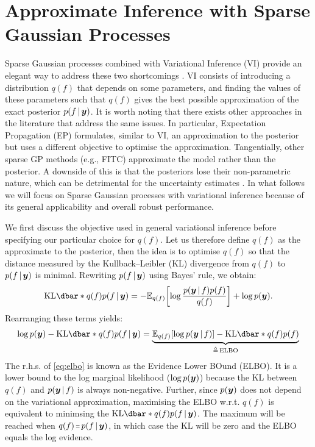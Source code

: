 \section{Approximate Inference with Sparse Gaussian Processes}

Sparse Gaussian processes combined with Variational Inference (VI) provide an elegant way to address these two shortcomings \citep{titsias2009, hensman2013, hensman2015scalable}. VI consists of introducing a distribution $q(f)$ that depends on some parameters, and finding the values of these parameters such that $q(f)$ gives the best possible approximation of the exact posterior $p(f \,|\, \bm{y} )$. It is worth noting that there exists other approaches in the literature that address the same issues. In particular, Expectation Propagation (EP) \citep{minka2001expectation,bui2017unifying} formulates, similar to VI, an approximation to the posterior but uses a different objective to optimise the approximation. Tangentially, other sparse GP methods (e.g., FITC) \citep{Snelson05,quinonero2005unifying} approximate the model rather than the posterior. A downside of this is that the posteriors lose their non-parametric nature, which can be detrimental for the uncertainty estimates \citep{bauer2016understanding}. In what follows we will focus on Sparse Gaussian processes with variational inference because of its general applicability and overall robust performance.

We first discuss the objective used in general variational inference before specifying our particular choice for $q(f)$. Let us therefore define $q(f)$ as the approximate to the posterior, then the idea is to optimise $q(f)$ so that the distance measured by the Kullback–Leibler (KL) divergence from $q(f)$ to $p(f \,|\, \bm{y})$ is minimal. Rewriting $p(f \,|\, \bm{y})$ using Bayes' rule, we obtain:
\begin{equation}
  \KL{q(f)}{p(f \given \vy)} = -{\Exp{q(f)}{\log \frac{p(\vy \given f) p(f)}{q(f)}}} + \log p(\vy).
\end{equation}
Rearranging these terms yields:
\begin{equation}
  \label{eq:elbo}
  \log p(\vy) - \KL{q(f)}{p(f \given \vy)} = 
  \underbrace{\Exp{q(f)}{\log p(\vy \given f)} - \KL{q(f)}{p(f)}}_{\triangleq\,\textrm{ELBO}}
\end{equation}
The r.h.s. of \cref{eq:elbo} is known as the Evidence Lower BOund (ELBO). It is a lower bound to the log marginal likelihood ($\log p(\bm{y})$) because the KL between $q(f)$ and $p(\bm{y} \,|\, f)$ is always non-negative. Further, since $p(\bm{y})$ does not depend on the variational approximation, maximising the ELBO w.r.t. $q(f)$ is equivalent to minimsing the $\KL{q(f)}{p(f \given \vy)}$. The maximum will be reached when $q(f) \shorteq p(f \given \vy)$, in which case the KL will be zero and the ELBO equals the log evidence. 

